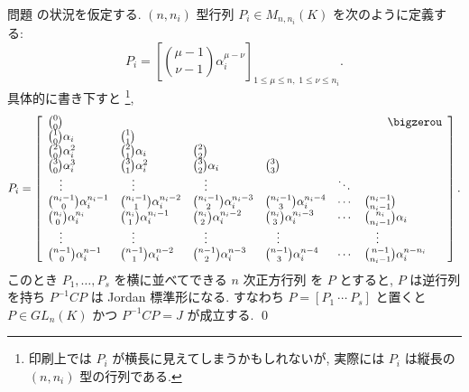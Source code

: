 \documentclass[12pt,twoside]{jarticle}
\begin{document}
\medskip

\begin{question}
\label{q:Jordan-companion-2}
  問題  の状況を仮定する.
  $(n,n_i)$ 型行列 $P_i\in M_{n,n_i}(K)$ を次のように定義する:
  \begin{equation*}
    P_i = \left[
      \binom{\mu-1}{\nu-1}\alpha_i^{\mu-\nu} 
    \right]_{1\le\mu\le n,\; 1\le\nu\le n_i}.
  \end{equation*}
  具体的に書き下すと%
  \footnote{印刷上では $P_i$ が横長に見えてしまうかもしれないが,
    実際には $P_i$ は縦長の $(n,n_i)$ 型の行列である.},
  \begin{equation*}
    P_i =
    \left[
    \begin{array}{llllll}
      \binom{0}{0}         & & & & & \qquad\bigzerou \\
      \binom{1}{0}\alpha_i   & \binom{1}{1}         & & & & \\
      \binom{2}{0}\alpha_i^2 & \binom{2}{1}\alpha_i   & \binom{2}{2} & & & \\
      \binom{3}{0}\alpha_i^3 & \binom{3}{1}\alpha_i^2 & \binom{3}{2}\alpha_i & \binom{3}{3} & & \\
      \quad\vdots            & \quad\vdots            & \quad\vdots          &              & \ddots & \\
      \binom{n_i-1}{0}\alpha_i^{n_i-1} & \binom{n_i-1}{1}\alpha_i^{n_i-2} & \binom{n_i-1}{2}\alpha_i^{n_i-3} & \binom{n_i-1}{3}\alpha_i^{n_i-4} & \cdots & \binom{n_i-1}{n_i-1} \\
      \binom{n_i}{0}\alpha_i^{n_i}     & \binom{n_i}{1}\alpha_i^{n_i-1}   & \binom{n_i}{2}\alpha_i^{n_i-2}   & \binom{n_i}{3}\alpha_i^{n_i-3}   & \cdots & \binom{n_i}{n_i-1}\alpha_i \\
      \quad\vdots                      & \quad\vdots                      & \quad\vdots                      & \quad\vdots                      &        & \quad\vdots \\
      \binom{n-1}{0}\alpha_i^{n-1}     & \binom{n-1}{1}\alpha_i^{n-2}     & \binom{n-1}{2}\alpha_i^{n-3}     & \binom{n-1}{3}\alpha_i^{n-4}     & \cdots & \binom{n-1}{n_i-1}\alpha_i^{n-n_i} \\
    \end{array}
    \right].
  \end{equation*}
  このとき $P_1,\dots,P_s$ を横に並べてできる $n$ 次正方行列
  を $P$ とすると, $P$ は逆行列を持ち $P^{-1}CP$ は Jordan 標準形になる. 
  すなわち $P=[P_1\ \cdots\ P_s]$ と置くと $P\in GL_n(K)$ 
  かつ $P^{-1}CP=J$ が成立する.
  \qed
\end{question}
\end{document}
